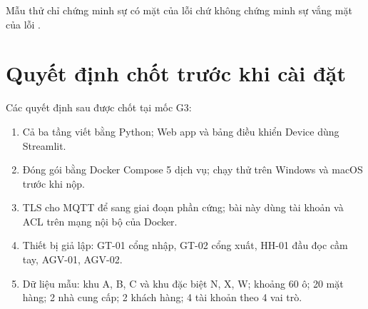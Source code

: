 Mẫu thử chỉ chứng minh sự có mặt của lỗi chứ không chứng minh sự vắng mặt của lỗi \cite[Ch.~10]{tung_qlhttt}.

\section{Quyết định chốt trước khi cài đặt}
\label{sec:moc3}

Các quyết định sau được chốt tại mốc G3:
\begin{enumerate}
  \item Cả ba tầng viết bằng Python; Web app và bảng điều khiển Device dùng Streamlit.
  \item Đóng gói bằng Docker Compose 5 dịch vụ; chạy thử trên Windows và macOS trước khi nộp.
  \item TLS cho MQTT để sang giai đoạn phần cứng; bài này dùng tài khoản và ACL trên mạng nội bộ của Docker.
  \item Thiết bị giả lập: GT-01 cổng nhập, GT-02 cổng xuất, HH-01 đầu đọc cầm tay, AGV-01, AGV-02.
  \item Dữ liệu mẫu: khu A, B, C và khu đặc biệt N, X, W; khoảng 60 ô; 20 mặt hàng; 2 nhà cung cấp; 2 khách hàng; 4 tài khoản theo 4 vai trò.
\end{enumerate}
